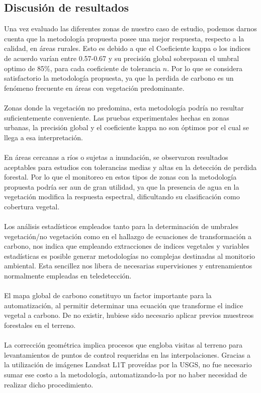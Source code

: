 \subsection{Discusi\'on de resultados}
Una vez evaluado las diferentes zonas de nuestro caso de estudio, podemos darnos cuenta que la metodolog\'ia propuesta posee una mejor respuesta, respecto a la calidad, en \'areas rurales. Esto es debido a que el Coeficiente kappa o los indices de acuerdo var\'ian entre 0.57-0.67 y su precisi\'on global sobrepasan el umbral optimo de 85\%, para cada coeficiente de tolerancia $ n $. Por lo que se considera satisfactorio la metodolog\'ia propuesta, ya que la perdida de carbono es un fen\'omeno frecuente en \'areas con vegetaci\'on predominante.\\~\\	
Zonas donde la vegetaci\'on no predomina, esta metodolog\'ia podr\'ia no resultar suficientemente conveniente. Las pruebas experimentales hechas en zonas urbanas, la precisi\'on global y el coeficiente kappa no son \'optimos por el cual se llega a esa interpretaci\'on.\\~\\
 En \'areas cercanas a r\'ios o sujetas a inundaci\'on, se observaron resultados aceptables para  estudios con tolerancias medias y altas en la detecci\'on de perdida forestal. Por lo que el monitoreo en estos tipos de zonas con la metodolog\'ia propuesta podr\'ia ser aun de gran utilidad, ya que la presencia de agua en la vegetaci\'on modifica la respuesta espectral, dificultando su clasificaci\'on como cobertura vegetal.\\~\\	
 Los an\'alisis estad\'isticos empleados tanto para la determinaci\'on de umbrales vegetaci\'on/no vegetaci\'on como en el hallazgo de ecuaciones de transformaci\'on a carbono, nos indica que empleando extracciones de indices vegetales y variables estad\'isticas es posible generar metodolog\'ias no complejas destinadas al monitorio ambiental. Esta sencillez nos libera de necesarias supervisiones y entrenamientos normalmente empleadas en teledetecci\'on.\\~\\	
El mapa global de carbono \cite{saatchi2011benchmark} constituyo un factor importante para la automatizaci\'on, al permitir determinar una ecuaci\'on que transforme el indice vegetal a carbono. De no existir, hubiese sido necesario aplicar previos muestreos forestales en el terreno.\\~\\	
 La correcci\'on geom\'etrica implica procesos que engloba visitas al terreno para levantamientos de puntos de control requeridas en las interpolaciones. Gracias a la utilizaci\'on de im\'agenes Landsat L1T prove\'idas por la USGS, no fue necesario sumar ese costo a la metodolog\'ia, automatizando-la por no haber necesidad de realizar dicho procedimiento.
